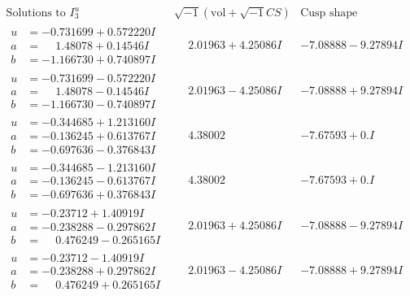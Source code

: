 \documentclass[1p]{elsarticle_modified}
\theoremstyle{definition}
\newcommand{\I}{\sqrt{-1}}
\begin{document}
$$\begin{array}{c|c|c}  
\text{Solutions to }I^u_{3}& \I (\text{vol} + \sqrt{-1}CS) & \text{Cusp shape}\\
 \hline 
\begin{aligned}
u &= -0.731699 + 0.572220 I \\
a &= \phantom{-}1.48078 + 0.14546 I \\
b &= -1.166730 + 0.740897 I\end{aligned}
 & \phantom{-}2.01963 + 4.25086 I & -7.08888 - 9.27894 I \\ \hline\begin{aligned}
u &= -0.731699 - 0.572220 I \\
a &= \phantom{-}1.48078 - 0.14546 I \\
b &= -1.166730 - 0.740897 I\end{aligned}
 & \phantom{-}2.01963 - 4.25086 I & -7.08888 + 9.27894 I \\ \hline\begin{aligned}
u &= -0.344685 + 1.213160 I \\
a &= -0.136245 + 0.613767 I \\
b &= -0.697636 - 0.376843 I\end{aligned}
 & \phantom{-}4.38002\phantom{ +0.000000I} & -7.67593 + 0. I\phantom{ +0.000000I} \\ \hline\begin{aligned}
u &= -0.344685 - 1.213160 I \\
a &= -0.136245 - 0.613767 I \\
b &= -0.697636 + 0.376843 I\end{aligned}
 & \phantom{-}4.38002\phantom{ +0.000000I} & -7.67593 + 0. I\phantom{ +0.000000I} \\ \hline\begin{aligned}
u &= -0.23712 + 1.40919 I \\
a &= -0.238288 - 0.297862 I \\
b &= \phantom{-}0.476249 - 0.265165 I\end{aligned}
 & \phantom{-}2.01963 + 4.25086 I & -7.08888 - 9.27894 I \\ \hline\begin{aligned}
u &= -0.23712 - 1.40919 I \\
a &= -0.238288 + 0.297862 I \\
b &= \phantom{-}0.476249 + 0.265165 I\end{aligned}
 & \phantom{-}2.01963 - 4.25086 I & -7.08888 + 9.27894 I \\ \hline\begin{aligned}

\end{aligned}
\end{array}$$
\end{document}
